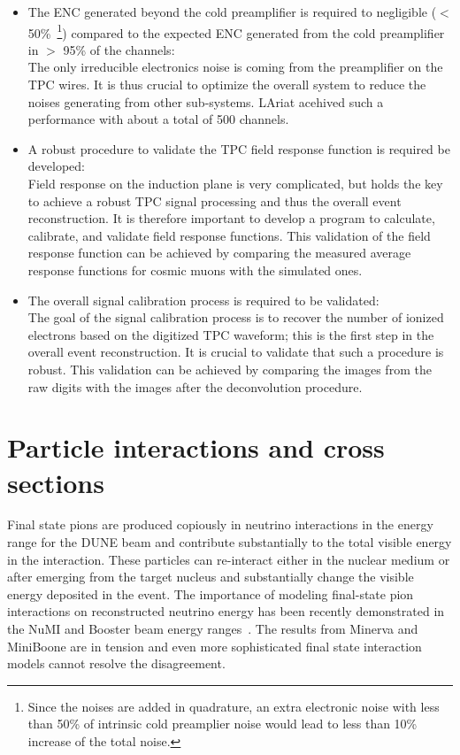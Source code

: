 \begin{itemize}
\item The ENC generated beyond the cold preamplifier is required to negligible ($<$ 50\%~\footnote{Since the 
noises are added in quadrature, an extra electronic noise with less than 50\% of intrinsic cold preamplier
noise would lead to less than 10\% increase of the total noise.}) compared to the 
expected ENC generated from the cold preamplifier in $>$ 95\% of the channels: \\
The only irreducible electronics noise is coming from the preamplifier on the TPC wires. It is thus
crucial to optimize the overall system to reduce the noises generating from other sub-systems. 
LAriat acehived such a performance with about a total of 500 channels. 
\item A robust procedure to validate the TPC field response function is required
be developed: \\
Field response on the induction plane is very complicated, but holds the key to achieve a robust TPC 
signal processing and thus the overall event reconstruction. It is therefore important to develop a 
program to calculate, calibrate, and validate field response functions. This validation of the field response function 
can be achieved by comparing the measured average response functions for cosmic muons with the simulated
ones. 
\item The overall signal calibration process is required to be validated: \\
The goal of the signal calibration process is to recover the number of ionized electrons based on
the digitized TPC waveform; this is the first step in the overall event reconstruction. It is crucial to 
validate that such a procedure is robust. This validation can be achieved by comparing the 
images from the raw digits with the images after the deconvolution procedure.
\end{itemize}




\section{Particle interactions and cross sections}



Final state pions are produced copiously in neutrino interactions in the energy range for the DUNE beam  and contribute 
substantially to the total visible energy in the interaction.
These particles can re-interact either in the nuclear medium or after emerging from the target nucleus
and substantially change the visible energy deposited in the event. 
The importance of modeling final-state pion interactions on reconstructed neutrino energy has 
been recently demonstrated in the NuMI and Booster beam energy ranges~\cite{miniboonefsi, minervafsi}. The results from Minerva and MiniBoone are in tension and even more sophisticated final state interaction models cannot resolve the disagreement.  


